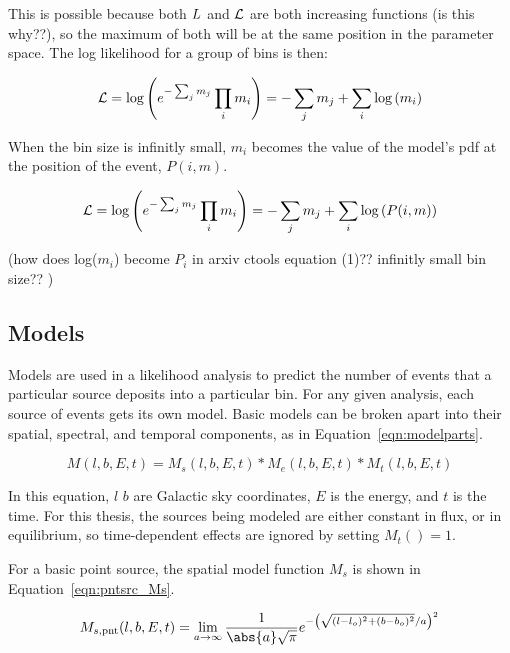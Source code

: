   This is possible because both $L$ and $\mathcal{L}$ are both {\color{red}increasing functions (is this why??)}, so the maximum of both will be at the same position in the parameter space.
  The log likelihood for a group of bins is then:
  
  \begin{equation}\label{eqn:simple_like_7}
    \mathcal{L} = \textrm{log} \left ( e^{- \sum_j m_j} \prod_i m_i \right ) = - \sum_j m_j + \sum_i \textrm{log} \left ( m_i \right )
  \end{equation}
  
  When the bin size is infinitly small, $m_i$ becomes the value of the model's pdf at the position of the event, $P(i,m)$.
  
  \begin{equation}\label{eqn:simple_like_8}
    \mathcal{L} = \textrm{log} \left ( e^{- \sum_j m_j} \prod_i m_i \right ) = - \sum_j m_j + \sum_i \textrm{log} \left ( P(i,m) \right )
  \end{equation}
    
  
  {\color{red}(how does log($m_i$) become $P_i$ in arxiv ctools equation (1)?? infinitly small bin size?? )}
  
  \subsection{Models}
  
  Models are used in a likelihood analysis to predict the number of events that a particular source deposits into a particular bin.
  For any given analysis, each source of events gets its own model.
  Basic models can be broken apart into their spatial, spectral, and temporal components, as in Equation~\ref{eqn:modelparts}.

  \begin{equation}\label{eqn:modelparts}
    M(l,b,E,t) = M_s(l,b,E,t) * M_e(l,b,E,t) * M_t(l,b,E,t)
  \end{equation}
  
  In this equation, $l$ $b$ are Galactic sky coordinates, $E$ is the energy, and $t$ is the time.
  For this thesis, the sources being modeled are either constant in flux, or in equilibrium, so time-dependent effects are ignored by setting $M_t() = 1$.

  For a basic point source, the spatial model function $M_s$ is shown in Equation~\ref{eqn:pntsrc_Ms}.

  \begin{equation}\label{eqn:pntsrc_Ms}
    M_{s,\textrm{pnt}}(l,b,E,t) = \lim_{a\to\infty} \frac{1}{ \abs{a} \sqrt{\pi} } e^{ - \left ( \sqrt{ (l-l_o)^2 + (b-b_o)^2 }/a \right )^2 }
  \end{equation}
  
